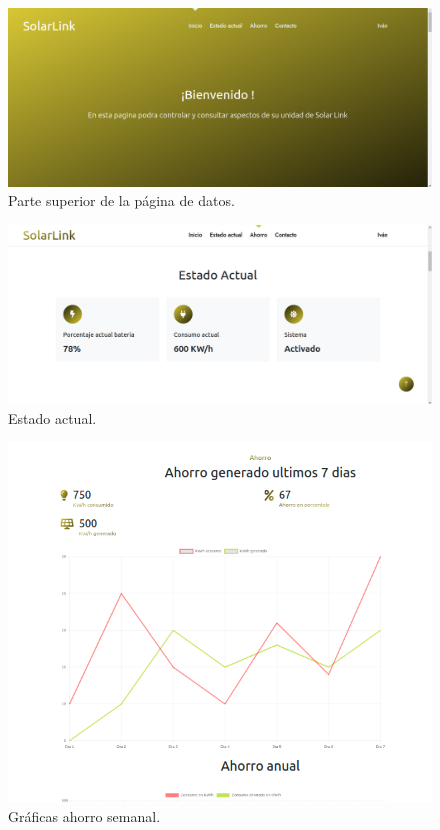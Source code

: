 \begin{figure}[H]
    \centering
    \includegraphics[width=1\linewidth]{web/Captura desde 2023-10-16 21-30-19.png}
    \caption{Parte superior de la página de datos.}
    \label{fig:enter-label}
\end{figure}

\begin{figure}[H]
    \centering
    \includegraphics[width=1\linewidth]{web/Captura desde 2023-10-16 21-30-33.png}
    \caption{Estado actual.}
    \label{fig:enter-label}
\end{figure}

\begin{figure}[H]
    \centering
    \includegraphics[width=0.75\linewidth]{web/Captura desde 2023-10-16 21-30-55.png}
    \caption{Gráficas ahorro semanal.}
    \label{fig:enter-label}
\end{figure}

